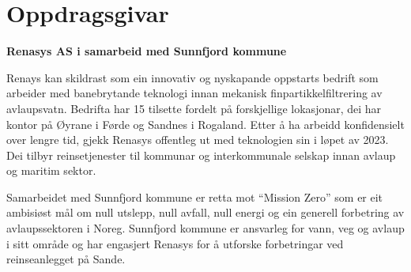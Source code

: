 \section{Oppdragsgivar}
\textbf{Renasys AS i samarbeid med Sunnfjord kommune}

Renays\citep{Renasys} kan skildrast som ein innovativ og nyskapande oppstarts bedrift som arbeider med banebrytande teknologi innan mekanisk finpartikkelfiltrering av avlaupsvatn.
Bedrifta har 15 tilsette fordelt på forskjellige lokasjonar, dei har kontor på Øyrane i Førde og Sandnes i Rogaland. 
Etter å ha arbeidd konfidensielt over lengre tid, gjekk Renasys offentleg ut med teknologien sin i løpet av 2023. 
Dei tilbyr reinsetjenester til kommunar og interkommunale selskap innan avlaup og maritim sektor.

Samarbeidet med Sunnfjord kommune\citep{SunnfjordKommune} er retta mot ``Mission Zero'' som er eit ambisiøst mål om 
null utslepp, null avfall, null energi og ein generell forbetring av avlaupssektoren i Noreg. \newline
Sunnfjord kommune er ansvarleg for vann, veg og avlaup i sitt område og har engasjert 
Renasys for å utforske forbetringar ved reinseanlegget på Sande.
\newline
\newline


